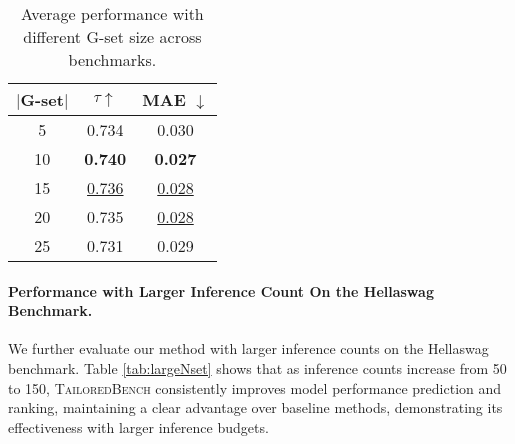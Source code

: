 \begin{table}[htbp]
\renewcommand\arraystretch{1}
\centering
\setlength{\tabcolsep}{1.25em} 
\begin{tabular}{ccc}
\toprule
\textbf{$\lvert$G-set$\rvert$} & \textbf{$\tau \uparrow$} & {\scriptsize \textbf{MAE} $\downarrow$}  \\ 
\midrule
\textsc{5}    & 0.734 & 0.030 \\
\textsc{10}   & \textbf{0.740} & \textbf{0.027} \\
\textsc{15}   & \uline{0.736} & \uline{0.028} \\
\textsc{20}   & 0.735 & \uline{0.028} \\
\textsc{25}   & 0.731 & 0.029 \\
\bottomrule
\end{tabular}
\caption{Average performance with different G-set size across benchmarks.}
\label{tab:gset}
\vspace{-0.5cm}
\end{table}

\paragraph{Performance with Larger Inference Count On the Hellaswag Benchmark.} 
We further evaluate our method with larger inference counts on the Hellaswag benchmark. 
Table \ref{tab:largeNset} shows that as inference counts increase from 50 to 150, \textsc{TailoredBench} consistently improves model performance prediction and ranking, maintaining a clear advantage over baseline methods, demonstrating its effectiveness with larger inference budgets.


